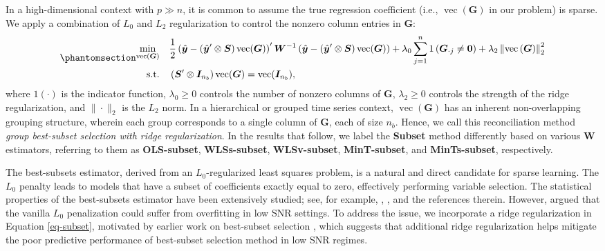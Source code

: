 \documentclass[
  11pt]{article}
\theoremstyle{plain}
\theoremstyle{remark}
\begin{document}
In a high-dimensional context with \(p \gg n\), it is common to assume
the true regression coefficient (i.e., \(\operatorname{vec}(\bm{G})\) in
our problem) is sparse. We apply a combination of \(L_0\) and \(L_2\)
regularization to control the nonzero column entries in \(\bm{G}\):
\begin{equation}\phantomsection\label{eq-subset}{ \begin{aligned}
\min_{\operatorname{vec}(\bm{G})} \quad & \frac{1}{2}\left(\hat{\bm{y}}-\left(\hat{\bm{y}}^{\prime} \otimes \bm{S}\right) \operatorname{vec}(\bm{G})\right)^{\prime} \bm{W}^{-1}\left(\hat{\bm{y}}-\left(\hat{\bm{y}}^{\prime} \otimes \bm{S}\right) \operatorname{vec}(\bm{G})\right) + \lambda_0 \sum_{j=1}^n 1\left(\bm{G}_{\cdot j} \neq \bm{0}\right) + \lambda_2 \left\|\operatorname{vec}\left(\bm{G}\right)\right\|_2^2 \\
\text{s.t.} \quad & \left(\bm{S}^{\prime} \otimes \bm{I}_{n_b}\right) \operatorname{vec}(\bm{G})=\operatorname{vec}(\bm{I}_{n_b}),
\end{aligned}
}\end{equation} where \(1(\cdot)\) is the indicator function,
\(\lambda_0 \geq 0\) controls the number of nonzero columns of
\(\bm{G}\), \(\lambda_2 \geq 0\) controls the strength of the ridge
regularization, and \(\|\cdot\|_2\) is the \(L_2\) norm. In a
hierarchical or grouped time series context,
\(\operatorname{vec}(\bm{G})\) has an inherent non-overlapping grouping
structure, wherein each group corresponds to a single column of
\(\bm{G}\), each of size \(n_b\). Hence, we call this reconciliation
method \emph{group best-subset selection with ridge regularization}. In
the results that follow, we label the \textbf{Subset} method differently
based on various \(\bm{W}\) estimators, referring to them as
\textbf{OLS-subset}, \textbf{WLSs-subset}, \textbf{WLSv-subset},
\textbf{MinT-subset}, and \textbf{MinTs-subset}, respectively.

The best-subsets estimator, derived from an \(L_0\)-regularized least
squares problem, is a natural and direct candidate for sparse learning.
The \(L_0\) penalty leads to models that have a subset of coefficients
exactly equal to zero, effectively performing variable selection. The
statistical properties of the best-subsets estimator have been
extensively studied; see, for example, \citet{Greenshtein2004-be},
\citet{Zhang2012-ge}, and the references therein. However,
\citet{Mazumder2022-hx} argued that the vanilla \(L_0\) penalization
could suffer from overfitting in low SNR settings. To address the issue,
we incorporate a ridge regularization in Equation \eqref{eq-subset},
motivated by earlier work on best-subset selection
\citep[e.g.,][]{Hazimeh2020-xd, Mazumder2022-hx}, which suggests that
additional ridge regularization helps mitigate the poor predictive
performance of best-subset selection method in low SNR regimes.
\end{document}
